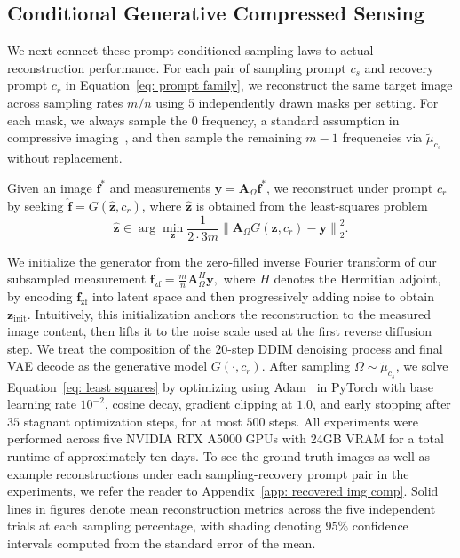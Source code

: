 \documentclass{article}
\theoremstyle{plain}
\theoremstyle{definition}
\theoremstyle{remark}
\begin{document}
\subsection{Conditional Generative Compressed Sensing}
We next connect these prompt-conditioned sampling laws to actual reconstruction performance. For each pair of sampling prompt $c_s$ and recovery prompt $c_r$ in Equation~\eqref{eq: prompt family}, we reconstruct the same target image across sampling rates $m / n$ using $5$ independently drawn masks per setting. For each mask, we always sample the $0$ frequency, a standard assumption in compressive imaging~\cite{adcock2021compressive}, and then sample the remaining $m-1$ frequencies via $\widetilde \mu_{c_s}$ without replacement.

Given an image $\mathbf{f}^*$ and measurements $\mathbf y = \mathbf A_{\Omega} \mathbf f^*$, we reconstruct under prompt $c_r$ by seeking $\widehat{\mathbf f}=G(\widehat{\mathbf z},c_r)$, where $\widehat{\mathbf z}$ is obtained from the least-squares problem
\begin{equation}\label{eq: least squares}
  \widehat{\mathbf z}
  \in
  \arg\min_{\mathbf z}
  \frac{1}{2 \cdot 3m}
  \left\|
    \mathbf A_{\Omega} G(\mathbf z,c_r) - \mathbf y
  \right\|_2^2.
\end{equation}


We initialize the generator from the zero-filled inverse Fourier transform of our subsampled measurement
$
  \mathbf f_{\mathrm{zf}}
  =
  \tfrac{m}{n}\mathbf A_{\Omega}^H \mathbf y,
$
where $H$ denotes the Hermitian adjoint, by encoding $\mathbf f_{\mathrm{zf}}$ into latent space and then progressively adding noise to obtain $\mathbf z_{\mathrm{init}}$. Intuitively, this initialization anchors the reconstruction to the measured image content, then lifts it to the noise scale used at the first reverse diffusion step. We treat the composition of the $20$-step DDIM denoising process and final VAE decode as the generative model $G(\cdot,c_r)$. After sampling $\Omega \sim \widetilde{\mu}_{c_s}$, we solve Equation~\eqref{eq: least squares} by optimizing using Adam~\cite{kingma2015adam} in PyTorch with base learning rate $10^{-2}$, cosine decay, gradient clipping at $1.0$, and early stopping after $35$ stagnant optimization steps, for at most $500$ steps. All experiments were performed across five NVIDIA RTX A5000 GPUs with 24GB VRAM for a total runtime of approximately ten days. To see the ground truth images as well as example reconstructions under each sampling-recovery prompt pair in the experiments, we refer the reader to Appendix~\ref{app: recovered img comp}. Solid lines in figures denote mean reconstruction metrics across the five independent trials at each sampling percentage, with shading denoting $95\%$ confidence intervals computed from the standard error of the mean.
\end{document}
